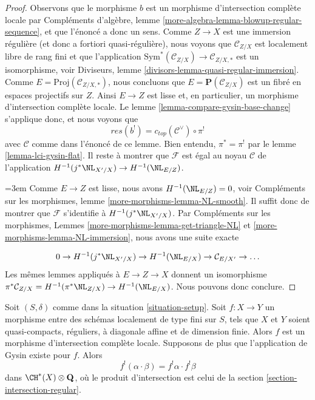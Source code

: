 \begin{proof}
Observons que le morphisme $b$ est un morphisme d'intersection complète locale
par Compléments d'algèbre, lemme \ref{more-algebra-lemma-blowup-regular-sequence},
et que l'énoncé a donc un sens. Comme $Z \to X$ est une
immersion régulière (et donc a fortiori quasi-régulière), nous voyons que $\mathcal{C}_{Z/X}$
est localement libre de rang fini et que l'application
$\text{Sym}^*(\mathcal{C}_{Z/X}) \to \mathcal{C}_{Z/X, *}$
est un isomorphisme, voir
Diviseurs, lemme \ref{divisors-lemma-quasi-regular-immersion}.
Comme $E = \text{Proj}(\mathcal{C}_{Z/X, *})$, nous concluons
que $E = \mathbf{P}(\mathcal{C}_{Z/X})$
est un fibré en espaces projectifs sur $Z$.
Ainsi $E \to Z$ est lisse et, en particulier, un morphisme d'intersection complète
locale. Le lemme \ref{lemma-compare-gysin-base-change}
s'applique donc, et nous voyons que
$$
res(b^!) = c_{top}(\mathcal{C}^\vee) \circ \pi^!
$$
avec $\mathcal{C}$ comme dans l'énoncé de ce lemme.
Bien entendu, $\pi^* = \pi^!$ par le lemme \ref{lemma-lci-gysin-flat}.
Il reste à montrer que $\mathcal{F}$ est égal au
noyau $\mathcal{C}$ de l'application
$H^{-1}(j^*\NL_{X'/X}) \to H^{-1}(\NL_{E/Z})$.

{\emergencystretch=3em\medskip\noindent
Comme $E \to Z$ est lisse, nous avons $H^{-1}(\NL_{E/Z}) = 0$, voir
Compléments sur les morphismes, lemme \ref{more-morphisms-lemma-NL-smooth}.
Il suffit donc de montrer que $\mathcal{F}$ s'identifie
à $H^{-1}(j^*\NL_{X'/X})$. Par Compléments sur les morphismes, Lemmes
\ref{more-morphisms-lemma-get-triangle-NL} et
\ref{more-morphisms-lemma-NL-immersion}, nous avons une suite exacte\par}
$$
0 \to H^{-1}(j^*\NL_{X'/X}) \to H^{-1}(\NL_{E/X}) \to
\mathcal{C}_{E/X'} \to \ldots
$$
Les mêmes lemmes appliqués à $E \to Z \to X$ donnent un isomorphisme
$\pi^*\mathcal{C}_{Z/X} = H^{-1}(\pi^*\NL_{Z/X}) \to H^{-1}(\NL_{E/X})$.
Nous pouvons donc conclure.
\end{proof}

\begin{lemma}
\label{lemma-lci-gysin-product-regular}
Soit $(S, \delta)$ comme dans la situation \ref{situation-setup}.
Soit $f : X \to Y$ un morphisme entre des schémas localement de type
fini sur $S$, tels que $X$ et $Y$ soient quasi-compacts,
réguliers, à diagonale affine et de dimension finie.
Alors $f$ est un morphisme d'intersection complète locale.
Supposons de plus que l'application de Gysin existe pour $f$. Alors
$$
f^!(\alpha \cdot \beta) = f^!\alpha \cdot f^!\beta
$$
dans $\CH^*(X) \otimes \mathbf{Q}$, où le produit d'intersection
est celui de la section \ref{section-intersection-regular}.
\end{lemma}

